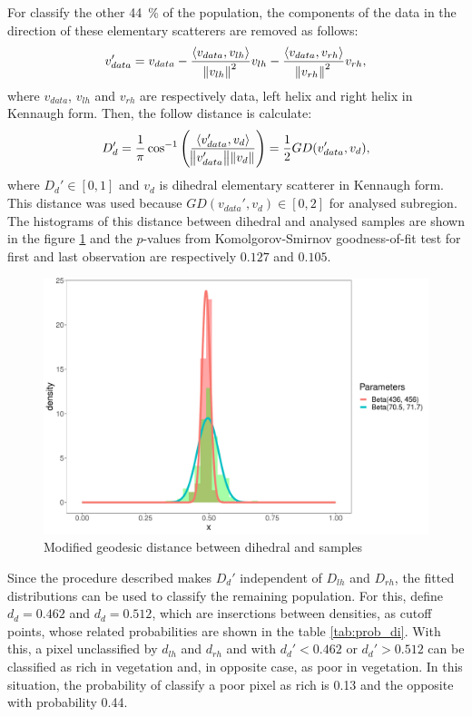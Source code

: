 \documentclass[12pt]{article}
\begin{document}
For classify the other \SI{44}{\percent} of the population, the components of the data in the direction of these elementary scatterers are removed as follows:
\begin{equation}
  v_{data}' =  v_{data} - \frac{\langle v_{data}, v_{lh} \rangle}{\norm{v_{lh}}^2} v_{lh} - \frac{\langle v_{data}, v_{rh} \rangle}{\norm{v_{rh}}^2} v_{rh},
\end{equation}
where $v_{data}$, $v_{lh}$ and $v_{rh}$ are respectively data, left helix and right helix in Kennaugh form. Then, the follow distance is calculate:
\begin{equation}
  D_{d}' = \frac{1}{\pi} \cos^{-1}\left(\frac{\langle v_{data}', v_d \rangle}{\norm{v_{data}'}\norm{v_d}}\right) = \frac{1}{2}GD(v_{data}', v_d),
\end{equation}
where $D_d' \in [0, 1]$ and $v_d$ is dihedral elementary scatterer in Kennaugh form. This distance was used because $GD(v_{data}', v_d) \in [0, 2]$ for analysed subregion. The histograms of this distance between dihedral and analysed samples are shown in the figure \ref{fig:hist_di} and the $p$-values from Komolgorov-Smirnov goodness-of-fit test for first and last observation are respectively $0.127$ and $0.105$.
\begin{figure}[hbt]
  \centering
  \includegraphics[width = .5\linewidth]{Histograms/hist_mod_di}
  \caption{Modified geodesic distance between dihedral and samples}
  \label{fig:hist_di}
\end{figure}

Since the procedure described makes $D_d'$ independent of $D_{lh}$ and $D_{rh}$, the fitted distributions can be used to classify the remaining population. For this,
define $d_d = 0.462$ and $d_d = 0.512$, which are inserctions between densities, as cutoff points, whose related probabilities are shown in the table \ref{tab:prob_di}.
With this, a pixel unclassified by $d_{lh}$ and $d_{rh}$ and with $d_d' < 0.462$ or $d_d' > 0.512$ can be classified as rich in vegetation and, in opposite case, as poor in vegetation. In this situation, the probability of classify a poor pixel as rich is 0.13 and the opposite with probability 0.44.
\end{document}
